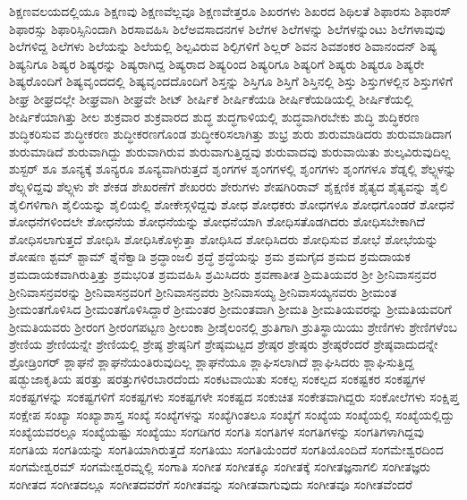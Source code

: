 {ಶಿಕ್ಷಣವಲಯದಲ್ಲಿಯೂ
ಶಿಕ್ಷಣವು
ಶಿಕ್ಷಣವೆಲ್ಲವೂ
ಶಿಕ್ಷಣವೇತ್ತರೂ
ಶಿಖರಗಳು
ಶಿಖರದ
ಶಿಥಿಲತೆ
ಶಿಫಾರಸು
ಶಿಫಾರಸ್
ಶಿಫಾರಸ್ಸು
ಶಿಫಾರಿಸ್ಸಿನಿಂದಾಗಿ
ಶಿರಸಾವಹಿಸಿ
ಶಿಲೆಅವಸಾದನಗಳ
ಶಿಲೆಗಳ
ಶಿಲೆಗಳನ್ನು
ಶಿಲೆಗಳನ್ನುಂಟು
ಶಿಲೆಗಳಾವುವು
ಶಿಲೆಗಳಿದ್ದ
ಶಿಲೆಗಳು
ಶಿಲೆಯನ್ನು
ಶಿಲೆಯಲ್ಲಿ
ಶಿಲ್ಪವಿರುವ
ಶಿಲ್ಪಿಗಳಿಗೆ
ಶಿಲ್ಲರ್
ಶಿವನ
ಶಿವಶಂಕರ
ಶಿವಾನಂದನ್
ಶಿಷ್ಯ
ಶಿಷ್ಯನಿಗೂ
ಶಿಷ್ಯರ
ಶಿಷ್ಯರನ್ನು
ಶಿಷ್ಯರಾಗಿದ್ದ
ಶಿಷ್ಯರಾದ
ಶಿಷ್ಯರಿಂದ
ಶಿಷ್ಯರಿಗೂ
ಶಿಷ್ಯರಿಗೆ
ಶಿಷ್ಯರು
ಶಿಷ್ಯರೂ
ಶಿಷ್ಯರೇ
ಶಿಷ್ಯರೊಂದಿಗೆ
ಶಿಷ್ಯವೃಂದದಲ್ಲಿ
ಶಿಷ್ಯವೃಂದದೊಂದಿಗೆ
ಶಿಸ್ತನ್ನು
ಶಿಸ್ತಿಗೂ
ಶಿಸ್ತಿಗೆ
ಶಿಸ್ತಿನಲ್ಲಿ
ಶಿಸ್ತು
ಶಿಸ್ತುಗಳಲ್ಲಿನ
ಶಿಸ್ತುಗಳಿಗೆ
ಶೀಘ್ರ
ಶೀಘ್ರದಲ್ಲೇ
ಶೀಘ್ರವಾಗಿ
ಶೀಘ್ರವೇ
ಶೀಟ್
ಶೀರ್ಷಿಕೆ
ಶೀರ್ಷಿಕೆಯಡಿ
ಶೀರ್ಷಿಕೆಯಡಿಯಲ್ಲಿ
ಶೀರ್ಷಿಕೆಯಲ್ಲಿ
ಶೀರ್ಷಿಕೆಯಾಗಿತ್ತು
ಶೀಲ
ಶುಕ್ರವಾರ
ಶುಕ್ರವಾರದ
ಶುದ್ಧ
ಶುದ್ಧಗಾಳಿಯಲ್ಲಿ
ಶುದ್ಧವಾಗಿರಬೇಕು
ಶುದ್ಧಿ
ಶುದ್ಧಿಕರಣ
ಶುದ್ಧಿಕರಿಸುವ
ಶುದ್ಧೀಕರಣ
ಶುದ್ಧೀಕರಣಗೊಂಡ
ಶುದ್ಧೀಕರಿಸಲಾಗಿತ್ತು
ಶುಭ್ರ
ಶುರು
ಶುರುಮಾಡಿದರು
ಶುರುಮಾಡಿದಾಗ
ಶುರುಮಾಡಿದೆ
ಶುರುವಾಗಿದ್ದು
ಶುರುವಾಗಿರುವ
ಶುರುವಾಗುತ್ತಿದ್ದವು
ಶುರುವಾದವು
ಶುರುವಾಯಿತು
ಶುಲ್ಕವಿರುವುದಿಲ್ಲ
ಶುಸ್ಟರ್
ಶೂ
ಶೂನ್ಯಕ್ಕೆ
ಶೂನ್ಯರೂ
ಶೂನ್ಯವಾಗಿರುತ್ತದೆ
ಶೃಂಗಗಳ
ಶೃಂಗಗಳಲ್ಲಿ
ಶೃಂಗಗಳು
ಶೃಂಗಗಳೂ
ಶೆಡ್ನಲ್ಲಿ
ಶೆಲ್ಫ್ಗಳನ್ನು
ಶೆಲ್ಫ್ಗಳಿದ್ದವು
ಶೆಲ್ಫ್ಗಳು
ಶೇ
ಶೇಕಡ
ಶೇಖರಣೆಗೆ
ಶೇಖರರು
ಶೇರುಗಳು
ಶೇಷಗಿರಿರಾವ್
ಶೈಕ್ಷಣಿಕ
ಶೈತ್ಯದ
ಶೈತ್ಯವನ್ನು
ಶೈಲಿ
ಶೈಲಿಗಳಿಗಾಗಿ
ಶೈಲಿಯನ್ನು
ಶೈಲಿಯಲ್ಲಿ
ಶೋಕೇಸ್ಗಳಿದ್ದವು
ಶೋಧ
ಶೋಧಕರು
ಶೋಧಗಳೂ
ಶೋಧಗೊಂಡರೆ
ಶೋಧನೆ
ಶೋಧನೆಗಳಿಂದಲೇ
ಶೋಧನೆಯ
ಶೋಧನೆಯನ್ನು
ಶೋಧನೆಯಾಗಿ
ಶೋಧಿಸತೊಡಗಿದರು
ಶೋಧಿಸಬೇಕಾಗಿದೆ
ಶೋಧಿಸಲಾಗುತ್ತದೆ
ಶೋಧಿಸಿ
ಶೋಧಿಸಿಕೊಳ್ಳುತ್ತಾ
ಶೋಧಿಸಿದ
ಶೋಧಿಸಿದರು
ಶೋಧಿಸುವ
ಶೋಭೆ
ಶೋಭೆಯನ್ನು
ಶೋಷಣ
ಶ್ಟಮ್
ಶ್ಟಾಮ್
ಶ್ನೆನೆಕ್ವಾಡಿ
ಶ್ರದ್ಧಾಂಜಲಿ
ಶ್ರದ್ಧೆ
ಶ್ರದ್ಧೆಯನ್ನು
ಶ್ರಮ
ಶ್ರಮಗೈದ
ಶ್ರಮದ
ಶ್ರಮದಾಯಕ
ಶ್ರಮದಾಯಕವಾಗಿರುತ್ತಿತ್ತು
ಶ್ರಮಭರಿತ
ಶ್ರಮವಹಿಸಿ
ಶ್ರಮಿಸಿದರು
ಶ್ರವಣಾತೀತ
ಶ್ರಿಮತಿಯವರ
ಶ್ರೀ
ಶ್ರೀನಿವಾಸನ್ರವರ
ಶ್ರೀನಿವಾಸನ್ರವರನ್ನು
ಶ್ರೀನಿವಾಸನ್ರವರಿಗೆ
ಶ್ರೀನಿವಾಸನ್ರವರು
ಶ್ರೀನಿವಾಸಯ್ಯ
ಶ್ರೀನಿವಾಸಯ್ಯನವರು
ಶ್ರೀಮಂತ
ಶ್ರೀಮಂತಗೊಳಿಸಿದ
ಶ್ರೀಮಂತಗೊಳಿಸಿದ್ದಾರೆ
ಶ್ರೀಮಂತರ
ಶ್ರೀಮಂತವಾಗಿ
ಶ್ರೀಮತಿ
ಶ್ರೀಮತಿಯವರನ್ನು
ಶ್ರೀಮತಿಯವರಿಗೆ
ಶ್ರೀಮತಿಯವರು
ಶ್ರೀರಂಗ
ಶ್ರೀರಂಗಪಟ್ಟಣ
ಶ್ರೀಲಂಕಾ
ಶ್ರೀಶೈಲಂನಲ್ಲಿ
ಶ್ರುತಿಗಾಗಿ
ಶ್ರುತಿಸ್ಥಾಯಿಯು
ಶ್ರೇಣಿಗಳು
ಶ್ರೇಣಿಗಳೆಂಬ
ಶ್ರೇಣಿಯ
ಶ್ರೇಣಿಯನ್ನೇ
ಶ್ರೇಣಿಯಲ್ಲಿ
ಶ್ರೇಷ್ಠ
ಶ್ರೇಷ್ಠನಿಗೆ
ಶ್ರೇಷ್ಠಮಟ್ಟದ
ಶ್ರೇಷ್ಠರ
ಶ್ರೇಷ್ಠರು
ಶ್ರೇಷ್ಠರೆಂದರೆ
ಶ್ರೇಷ್ಠವಾದುದನ್ನೇ
ಶ್ರೋಡ್ರಿಂಗರ್
ಶ್ಲಾಘನೆ
ಶ್ಲಾಘನೆಯಂತಿರುವುದಿಲ್ಲ
ಶ್ಲಾಘನೆಯೂ
ಶ್ಲಾಘಿಸಲಾಗಿದೆ
ಶ್ಲಾಘಿಸಿದರು
ಶ್ಲಾಘಿಸುತ್ತಿದ್ದ
ಷಡ್ಭುಜಾಕೃತಿಯ
ಷರತ್ತು
ಷರತ್ತುಗಳಿರಬಾರದೆಂದು
ಸಂಕಟವಾಯಿತು
ಸಂಕಲ್ಪ
ಸಂಕಲ್ಪದ
ಸಂಕಷ್ಟಕರ
ಸಂಕಷ್ಟಗಳ
ಸಂಕಷ್ಟಗಳನ್ನು
ಸಂಕಷ್ಟಗಳಿಗೆ
ಸಂಕಷ್ಟಗಳು
ಸಂಕಷ್ಟಗಳೇ
ಸಂಕಷ್ಟದ
ಸಂಕುಚಿತ
ಸಂಕೇತವಾಗಿದ್ದರು
ಸಂಕೋಲೆಗಳು
ಸಂಕ್ಷಿಪ್ತ
ಸಂಕ್ಷೇಪ
ಸಂಖ್ಯಾ
ಸಂಖ್ಯಾಶಾಸ್ತ್ರ
ಸಂಖ್ಯೆ
ಸಂಖ್ಯೆಗಳನ್ನು
ಸಂಖ್ಯೆಗಿಂತಲೂ
ಸಂಖ್ಯೆಗೆ
ಸಂಖ್ಯೆಯ
ಸಂಖ್ಯೆಯಲ್ಲಿ
ಸಂಖ್ಯೆಯಲ್ಲಿದ್ದು
ಸಂಖ್ಯೆಯವರಲ್ಲೂ
ಸಂಖ್ಯೆಯಷ್ಟು
ಸಂಖ್ಯೆಯು
ಸಂಗಡಿಗರ
ಸಂಗತಿ
ಸಂಗತಿಗಳ
ಸಂಗತಿಗಳನ್ನು
ಸಂಗತಿಗಳಾಗಿದ್ದವು
ಸಂಗತಿಯ
ಸಂಗತಿಯನ್ನು
ಸಂಗತಿಯಾಗಿರುತ್ತದೆ
ಸಂಗತಿಯು
ಸಂಗತಿಯೆಂದರೆ
ಸಂಗತಿಯೊಂದಿದೆ
ಸಂಗಮೇಶ್ವರದಿಂದ
ಸಂಗಮೇಶ್ವರಮ್
ಸಂಗಮೇಶ್ವರಮ್ನಲ್ಲಿ
ಸಂಗಾತಿ
ಸಂಗೀತ
ಸಂಗೀತಕ್ಕೂ
ಸಂಗೀತಕ್ಕೆ
ಸಂಗೀತಜ್ಞನಾಗಲಿ
ಸಂಗೀತಜ್ಞರು
ಸಂಗೀತದ
ಸಂಗೀತದಲ್ಲೂ
ಸಂಗೀತದವರೆಗೆ
ಸಂಗೀತವನ್ನು
ಸಂಗೀತವಾಗುವುದು
ಸಂಗೀತವೂ
ಸಂಗೀತವೆಂದರೆ
}
